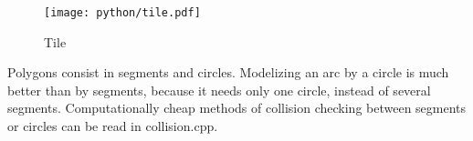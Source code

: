 \documentclass{extarticle}
\begin{document}
\begin{figure}[H]
\hspace*{-9.2cm}
    \texttt{[image: python/tile.pdf]}
	\caption{Tile}
\end{figure}

Polygons consist in segments and circles. Modelizing an arc by a circle is much better than by segments, because it needs only one circle, instead of several segments. Computationally cheap methods of collision checking between segments or circles can be read in collision.cpp.


{}
\end{document}
